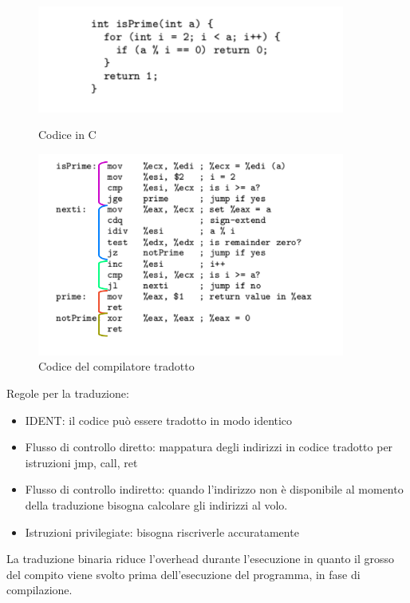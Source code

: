 \documentclass{article}
\begin{document}
		\begin{figure}[ht]
		    \centering
		    \begin{minipage}{0.5\textwidth}
		        \centering
		        \includegraphics[width=0.9\textwidth]{SAC_B1_binaryTranslation01.png} %
		        \caption{Codice in C}
		    \end{minipage}\hfill
		    \begin{minipage}{0.5\textwidth}
		        \centering
		        \includegraphics[width=0.9\textwidth]{SAC_B1_binaryTranslation02.png} %
		        \caption{Codice del compilatore tradotto}
		    \end{minipage}
		\end{figure}
		\newpage
		Regole per la traduzione:
		\begin{itemize}
		    \item IDENT: il codice può essere tradotto in modo identico
		    \item Flusso di controllo diretto: mappatura degli indirizzi in codice tradotto per istruzioni jmp, call, ret
		    \item Flusso di controllo indiretto: quando l'indirizzo non è disponibile al momento della traduzione bisogna calcolare gli indirizzi al volo.
		    \item Istruzioni privilegiate: bisogna riscriverle accuratamente
		\end{itemize}
		La traduzione binaria riduce l'overhead durante l'esecuzione in quanto il grosso del compito viene svolto prima dell'esecuzione del programma, in fase di compilazione. 
		
\end{document}
